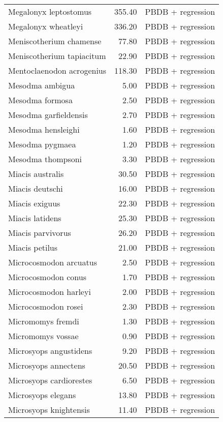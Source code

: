 \begin{table}[ht]
\begin{tabular}{lrl}
  Megalonyx leptostomus & 355.40 & PBDB + regression \\ 
  Megalonyx wheatleyi & 336.20 & PBDB + regression \\ 
  Meniscotherium chamense & 77.80 & PBDB + regression \\ 
  Meniscotherium tapiacitum & 22.90 & PBDB + regression \\ 
  Mentoclaenodon acrogenius & 118.30 & PBDB + regression \\ 
  Mesodma ambigua & 5.00 & PBDB + regression \\ 
  Mesodma formosa & 2.50 & PBDB + regression \\ 
  Mesodma garfieldensis & 2.70 & PBDB + regression \\ 
  Mesodma hensleighi & 1.60 & PBDB + regression \\ 
  Mesodma pygmaea & 1.20 & PBDB + regression \\ 
  Mesodma thompsoni & 3.30 & PBDB + regression \\ 
  Miacis australis & 30.50 & PBDB + regression \\ 
  Miacis deutschi & 16.00 & PBDB + regression \\ 
  Miacis exiguus & 22.30 & PBDB + regression \\ 
  Miacis latidens & 25.30 & PBDB + regression \\ 
  Miacis parvivorus & 26.20 & PBDB + regression \\ 
  Miacis petilus & 21.00 & PBDB + regression \\ 
  Microcosmodon arcuatus & 2.50 & PBDB + regression \\ 
  Microcosmodon conus & 1.70 & PBDB + regression \\ 
  Microcosmodon harleyi & 2.00 & PBDB + regression \\ 
  Microcosmodon rosei & 2.30 & PBDB + regression \\ 
  Micromomys fremdi & 1.30 & PBDB + regression \\ 
  Micromomys vossae & 0.90 & PBDB + regression \\ 
  Microsyops angustidens & 9.20 & PBDB + regression \\ 
  Microsyops annectens & 20.50 & PBDB + regression \\ 
  Microsyops cardiorestes & 6.50 & PBDB + regression \\ 
  Microsyops elegans & 13.80 & PBDB + regression \\ 
  Microsyops knightensis & 11.40 & PBDB + regression \\ 

\end{tabular}
\end{table}
